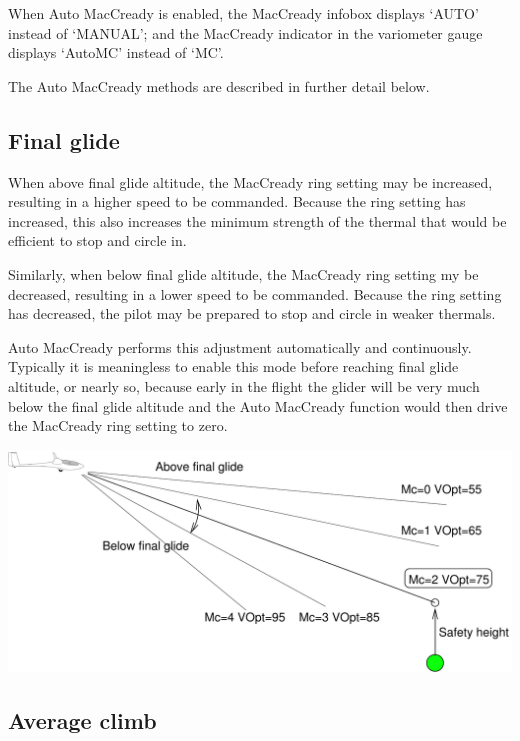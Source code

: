\documentclass[a4paper,12pt]{refrep}
\begin{document}
When Auto MacCready is enabled, the MacCready infobox displays `AUTO'
instead of `MANUAL'; and the MacCready indicator in the variometer
gauge displays `AutoMC' instead of `MC'.

The Auto MacCready methods are described in further detail below.

\subsection*{Final glide}
When above final glide altitude, the MacCready ring setting may be
increased, resulting in a higher speed to be commanded.  Because the
ring setting has increased, this also increases the minimum strength
of the thermal that would be efficient to stop and circle in.

Similarly, when below final glide altitude, the MacCready ring setting
my be decreased, resulting in a lower speed to be commanded.  Because
the ring setting has decreased, the pilot may be prepared to stop and
circle in weaker thermals.

Auto MacCready performs this adjustment automatically and
continuously.  Typically it is meaningless to enable this mode before
reaching final glide altitude, or nearly so, because early in the
flight the glider will be very much below the final glide altitude and
the Auto MacCready function would then drive the MacCready ring
setting to zero.

\begin{maxipage}
\begin{center}
\includegraphics[angle=0,width=0.8\linewidth,keepaspectratio='true']{figures/automc.pdf}
\end{center}
\end{maxipage}

\subsection*{Average climb}
\end{document}
